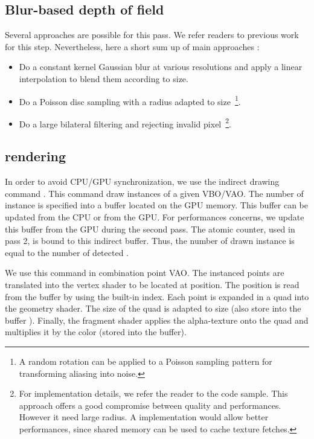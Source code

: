 \subsection{Blur-based depth of field}
Several approaches are possible for this pass. We refer readers to previous work for this step. Nevertheless, here a short sum up of main approaches :
\begin{itemize}
	\item Do a constant kernel Gaussian blur at various resolutions and apply a linear interpolation to blend them according to \coc size.
	\item Do a Poisson disc sampling with a radius adapted to \coc size~\footnote{A random rotation can be applied to a Poisson sampling pattern for transforming aliasing into noise.}.
	\item Do a large bilateral filtering and rejecting invalid pixel~\footnote{For implementation details, we refer the reader to the code sample. This approach offers a good compromise between quality and performances. However it need large radius. A \opencl implementation would allow better performances, since shared memory can be used to cache texture fetches.}.
\end{itemize}


\subsection{\Bokeh rendering}
In order to avoid CPU/GPU synchronization, we use the indirect drawing command . This command draw instances of a given VBO/VAO. The number of instance is specified into a buffer located on the GPU memory. This buffer can be updated from the CPU or from the GPU. For performances concerns, we update this buffer from the GPU during the second pass. The atomic counter, used in pass 2, is bound to this indirect buffer. Thus, the number of drawn instance is equal to the number of detected \bokeh.

We use this command in combination point VAO. The instanced points are translated into the vertex shader to be located at \bokeh position. The position is read from the  buffer by using the built-in  index. Each point is expanded in a quad into the geometry shader. The size of the quad is adapted to \bokeh size (also store into the  buffer ). Finally, the fragment shader applies the \bokeh alpha-texture onto the quad and multiplies it by the \bokeh color (stored into the  buffer).

